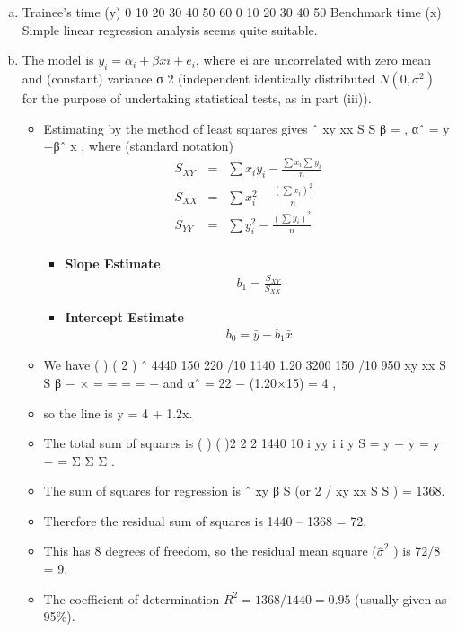 \documentclass[a4paper,12pt]{article}
\begin{document}
\begin{enumerate}[(a)]
\item Trainee's time (y)
0
10
20
30
40
50
60
0 10 20 30 40 50
Benchmark time (x)
Simple linear regression analysis seems quite suitable.
\item  The model is $y_i = \alpha_i + \beta xi + e_i$, where {ei} are uncorrelated with zero mean and
(constant) variance σ 2 (independent identically distributed $N(0, \sigma^2)$ for the purpose of
undertaking statistical tests, as in part (iii)). \begin{itemize}
\item Estimating by the method of least squares
gives
ˆ xy
xx
S
S
β = , αˆ = y −βˆ x ,
where (standard notation)
\begin{eqnarray*}
S_{XY} &=&
\sum x_iy_i - \frac{\sum x_i\sum y_i}{n}\\
S_{XX} &=&
\sum x_i^2 - \frac{(\sum x_i)^2}{n}\\
S_{YY} &=&
\sum y_i^2 - \frac{(\sum y_i)^2}{n}\\
\end{eqnarray*}
\begin{itemize}
\item \textbf{ Slope Estimate}
\begin{eqnarray*}
b_1 = \frac{S_{XY}}{S_{XX}}
\end{eqnarray*}
\item \textbf{ Intercept Estimate}
\begin{eqnarray*}
 b_0 = \bar{y} -b_1\bar{x}
\end{eqnarray*}
\end{itemize}
\item We have
( )
( 2 )
ˆ 4440 150 220 /10 1140 1.20
3200 150 /10 950
xy
xx
S
S
β
− ×
= = = =
−
and αˆ = 22 − (1.20×15) = 4 ,
\item so the line is
y = 4 + 1.2x.
\item 
The total sum of squares is ( ) ( )2
2 2 1440
10
i
yy i i
y
S = y − y = y − = Σ Σ Σ .

\item The sum of squares for regression is ˆ
xy β S (or 2 / xy xx S S ) = 1368.
\item Therefore the residual sum of squares is 1440 – 1368 = 72.
\item This has 8 degrees of freedom, so the residual mean square ($\hat{\sigma}^2$ ) is 72/8 = 9.
\item The coefficient of determination $R^2 = 1368/1440 = 0.95$ (usually given as 95\%).
\end{itemize}
\newpage
\begin{framed}


\end{framed}
\end{enumerate}
\end{document}
